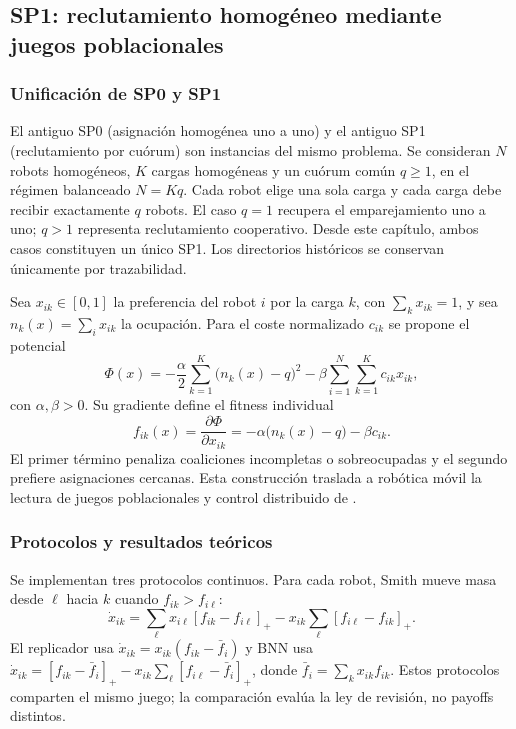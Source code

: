 \subsection{SP1: reclutamiento homogéneo mediante juegos poblacionales}
\label{sec:resultados-sp1-homogeneous}

\subsubsection{Unificación de SP0 y SP1}

El antiguo SP0 (asignación homogénea uno a uno) y el antiguo SP1
(reclutamiento por cuórum) son instancias del mismo problema. Se consideran $N$
robots homogéneos, $K$ cargas homogéneas y un cuórum común $q\geq1$, en el régimen
balanceado $N=Kq$. Cada robot elige una sola carga y cada carga debe recibir
exactamente $q$ robots. El caso $q=1$ recupera el emparejamiento uno a uno; $q>1$
representa reclutamiento cooperativo. Desde este capítulo, ambos casos constituyen
un único SP1. Los directorios históricos se conservan únicamente por trazabilidad.

Sea $x_{ik}\in[0,1]$ la preferencia del robot $i$ por la carga $k$, con
$\sum_k x_{ik}=1$, y sea $n_k(x)=\sum_i x_{ik}$ la ocupación. Para el coste
normalizado $c_{ik}$ se propone el potencial
\begin{equation}
 \Phi(x)=-\frac{\alpha}{2}\sum_{k=1}^{K}\bigl(n_k(x)-q\bigr)^2
         -\beta\sum_{i=1}^{N}\sum_{k=1}^{K}c_{ik}x_{ik},
 \label{eq:sp1-potential}
\end{equation}
con $\alpha,\beta>0$. Su gradiente define el fitness individual
\begin{equation}
 f_{ik}(x)=\frac{\partial\Phi}{\partial x_{ik}}
          =-\alpha\bigl(n_k(x)-q\bigr)-\beta c_{ik}.
 \label{eq:sp1-fitness}
\end{equation}
El primer término penaliza coaliciones incompletas o sobreocupadas y el segundo
prefiere asignaciones cercanas. Esta construcción traslada a robótica móvil la
lectura de juegos poblacionales y control distribuido de
\citet{quijano2017population,martinez2020formation,martinezpiazuelo2022tcss}.

\subsubsection{Protocolos y resultados teóricos}

Se implementan tres protocolos continuos. Para cada robot, Smith mueve masa desde
$\ell$ hacia $k$ cuando $f_{ik}>f_{i\ell}$:
\begin{equation}
 \dot x_{ik}=\sum_{\ell}x_{i\ell}[f_{ik}-f_{i\ell}]_+
 -x_{ik}\sum_{\ell}[f_{i\ell}-f_{ik}]_+ .
 \label{eq:sp1-smith}
\end{equation}
El replicador usa $\dot x_{ik}=x_{ik}(f_{ik}-\bar f_i)$ y BNN usa
$\dot x_{ik}=[f_{ik}-\bar f_i]_+-x_{ik}\sum_\ell[f_{i\ell}-\bar f_i]_+$,
donde $\bar f_i=\sum_kx_{ik}f_{ik}$. Estos protocolos comparten el mismo juego;
la comparación evalúa la ley de revisión, no payoffs distintos.

